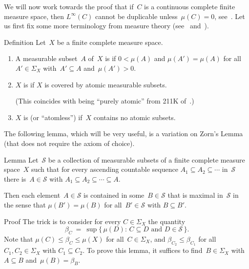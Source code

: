 \documentclass[a]{subfiles}
\begin{document}
\begin{parsec}%
\begin{point}%
We will now work towards
the proof that
if~$C$ is a continuous complete finite measure space,
then
$L^\infty(C)$
cannot be duplicable 
unless~$\mu(C)=0$,
see~.
Let us first fix some more terminology
from measure theory (see~ and~\cite{fremlin}).
\end{point}
\begin{point}{Definition}
\label{def:measure-space}
Let~$X$ be a finite complete measure space.
\begin{enumerate}
\item
A measurable subset~$A$ of~$X$
is 
if $0<\mu(A)$
and $\mu(A')=\mu(A)$ for all~$A'\in\Sigma_X$
with~$A'\subseteq A$ and~$\mu(A')>0$.

\item
$X$ is  if $X$ is covered by atomic measurable subsets.

(This coincides with being ``purely atomic''
from 211K of~\cite{fremlin}.)
\item
$X$ is 
(or ``atomless'')
if~$X$ contains no atomic subsets.
\end{enumerate}
\end{point}
\begin{point}%
The following lemma,
which will be very useful,
is a variation on
Zorn's Lemma
(that does not require the axiom of choice).
\end{point}
\begin{point}{Lemma}
Let~$\mathcal{S}$
be a collection of measurable subsets of
a finite complete measure space~$X$ 
such that 
for 
every ascending countable sequence
$A_1\subseteq A_2 \subseteq \dotsb$
in~$\mathcal{S}$
there is~$A\in\mathcal{S}$
with $A_1\subseteq A_2\subseteq\dotsb \subseteq A$.

Then each element~$A\in\mathcal{S}$
is contained in some~$B\in\mathcal{S}$
that is maximal in~$\mathcal{S}$ in the sense
that $\mu(B')=\mu(B)$
for all~$B'\in\mathcal{S}$ with $B\subseteq B'$.
\begin{point}{Proof}
The trick is to consider for every $C\in\Sigma_X$
the quantity
\begin{equation*}
	\beta_C \ = \ \sup\{\,\mu(D)\colon\, C\subseteq D
\text{ and }D\in \mathcal{S}\,\}.
\end{equation*}
Note that $\mu(C)\leq \beta_C \leq \mu(X)$
for all~$C\in\Sigma_X$,
	and $\beta_{C_2}\leq \beta_{C_1}$
	for all~$C_1,C_2\in\Sigma_X$ with $C_1 \subseteq C_2$.
To prove this lemma, it suffices to find~$B\in\Sigma_X$
with $A\subseteq B$ and~$\mu(B)=\beta_B$.


\end{point}
\end{point}
\end{parsec}
\end{document}
